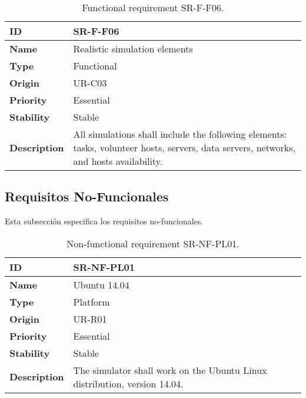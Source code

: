 \begin{center}
\begin{table*}[htbp]
\centering
\begin{tabular}{@{}p{2.5cm} p{9cm}@{}} 
\toprule
\textbf{ID} 				& SR-F-F06\\
\midrule
\textbf{Name} 			& Realistic simulation elements \\
\midrule
\textbf{Type} 			& Functional \\
\midrule
\textbf{Origin} 			& UR-C03 \\
\midrule
\textbf{Priority}		& Essential \\
\midrule
\textbf{Stability} 		& Stable \\
\midrule
\textbf{Description} 	& All simulations shall include the following elements: tasks, volunteer hosts, servers, data servers, networks, and hosts availability. \\
\bottomrule
\end{tabular}
\caption{Functional requirement SR-F-F06.}
\label{tab:srff06}
\end{table*}
\end{center}


\subsection{Requisitos No-Funcionales}

Esta subsección especifica los requisitos no-funcionales.

\begin{center}
\begin{table*}[htbp]
\centering
\begin{tabular}{@{}p{2.5cm} p{9cm}@{}} 
\toprule
\textbf{ID} 				& SR-NF-PL01\\
\midrule
\textbf{Name} 			& Ubuntu 14.04 \\
\midrule
\textbf{Type} 			& Platform \\
\midrule
\textbf{Origin} 			& UR-R01 \\
\midrule
\textbf{Priority}		& Essential \\
\midrule
\textbf{Stability} 		& Stable \\
\midrule
\textbf{Description} 	& The simulator shall work on the Ubuntu Linux distribution, version 14.04. \\
\bottomrule
\end{tabular}
\caption{Non-functional requirement SR-NF-PL01.}
\label{tab:srnfpl01}
\end{table*}
\end{center}

